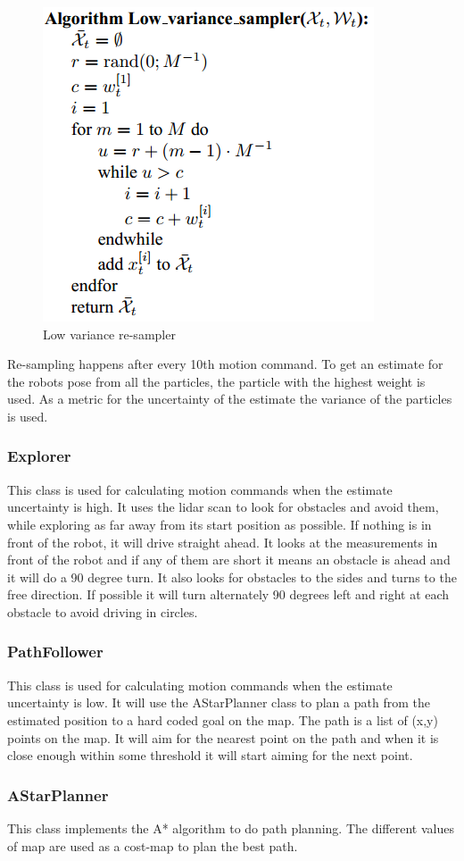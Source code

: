 \begin{figure}[H]
\centering
\includegraphics[scale=0.40]{images/low_variance_resampler}
\caption{Low variance re-sampler}
\label{fig:low_variance}
\end{figure}

Re-sampling happens after every 10th motion command. To get an estimate for the robots pose from all the particles, the particle with the highest weight is used. As a metric for the uncertainty of the estimate the variance of the particles is used.

\subsubsection{Explorer}
This class is used for calculating motion commands when the estimate uncertainty is high. It uses the lidar scan to look for obstacles and avoid them, while exploring as far away from its start position as possible. If nothing is in front of the robot, it will drive straight ahead. It looks at the measurements in front of the robot and if any of them are short it means an obstacle is ahead and it will do a 90 degree turn. It also looks for obstacles to the sides and turns to the free direction. If possible it will turn alternately 90 degrees left and right at each obstacle to avoid driving in circles. 

\subsubsection{PathFollower}
This class is used for calculating motion commands when the estimate uncertainty is low. It will use the AStarPlanner class to plan a path from the estimated position to a hard coded goal on the map. The path is a list of (x,y) points on the map. It will aim for the nearest point on the path and when it is close enough within some threshold it will start aiming for the next point.

\subsubsection{AStarPlanner}
This class implements the A* algorithm to do path planning. The different values of map are used as a cost-map to plan the best path.
